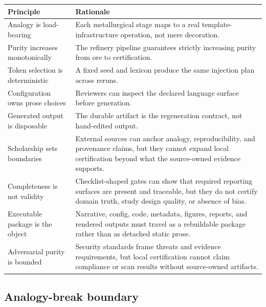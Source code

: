 \documentclass[
]{article}
\newcounter{none} %
\begin{document}
{\def\LTcaptype{none} %
\begin{longtable}[]{@{}
  >{\raggedright\arraybackslash}p{}
  >{\raggedright\arraybackslash}p{}@{}}
\toprule\noalign{}
\begin{minipage}[b]{\linewidth}\raggedright
Principle
\end{minipage} & \begin{minipage}[b]{\linewidth}\raggedright
Rationale
\end{minipage} \\
\midrule\noalign{}
\endhead
\bottomrule\noalign{}
\endlastfoot
Analogy is load-bearing & Each metallurgical stage maps to a real
template-infrastructure operation, not mere decoration. \\
Purity increases monotonically & The refinery pipeline guarantees
strictly increasing purity from ore to certification. \\
Token selection is deterministic & A fixed seed and lexicon produce the
same injection plan across reruns. \\
Configuration owns prose choices & Reviewers can inspect the declared
language surface before generation. \\
Generated output is disposable & The durable artifact is the
regeneration contract, not hand-edited output. \\
Scholarship sets boundaries & External sources can anchor analogy,
reproducibility, and provenance claims, but they cannot expand local
certification beyond what the source-owned evidence supports. \\
Completeness is not validity & Checklist-shaped gates can show that
required reporting surfaces are present and traceable, but they do not
certify domain truth, study design quality, or absence of bias. \\
Executable package is the object & Narrative, config, code, metadata,
figures, reports, and rendered outputs must travel as a rebuildable
package rather than as detached static prose. \\
Adversarial purity is bounded & Security standards frame threats and
evidence requirements, but local certification cannot claim compliance
or scan results without source-owned artifacts. \\
\end{longtable}
}

\subsection{Analogy-break boundary}\label{analogy-break-boundary}
\end{document}
